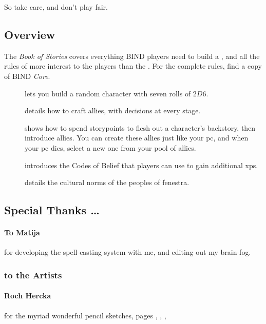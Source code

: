 \begin{multicols}{2}
So take care, and don't play fair.

\columnbreak

\subsection*{Overview}

The \textit{Book of Stories} covers everything BIND players need to build a , and all the rules of more interest to the players than the .
For the complete rules, find a copy of BIND \textit{Core}.

\begin{description}
  \item[]
  lets you build a random character with seven rolls of $2D6$.
  \item[]
  details how to craft allies, with decisions at every stage.
  \item[] shows how to spend \glspl{storypoint} to flesh out a character's backstory, then introduce allies.
  You can create these allies just like your \gls{pc}, and when your \gls{pc} dies, select a new one from your pool of allies.
  \item[] introduces the Codes of Belief that players can use to gain additional \glspl{xp}.
  \item[] details the cultural norms of the peoples of \gls{fenestra}.
\end{description}

\subsection*{Special Thanks \ldots}

\paragraph{To Matija}
for developing the spell-casting system with me, and editing out my brain-fog.

\subsubsection*{to the Artists}

\paragraph{Roch Hercka} for the myriad wonderful pencil sketches, pages 
\pageref{Roch_Hercka/five_races}, 
\pageref{Roch_Hercka/xp-1}, 
\pageref{Roch_Hercka/xp-2}, 


\end{multicols}
